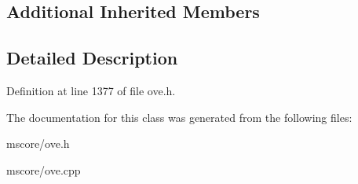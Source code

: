 \subsection*{Additional Inherited Members}


\subsection{Detailed Description}


Definition at line 1377 of file ove.\+h.



The documentation for this class was generated from the following files\+:\begin{DoxyCompactItemize}
\item 
mscore/ove.\+h\item 
mscore/ove.\+cpp\end{DoxyCompactItemize}
